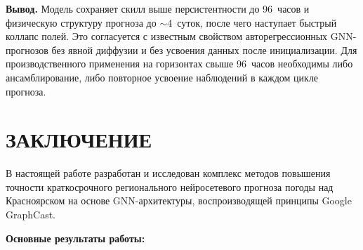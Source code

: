 \documentclass[14pt,a4paper]{extarticle}
\numberwithin{table}{section}
\numberwithin{figure}{section}
\numberwithin{equation}{section}
\begin{document}
\textbf{Вывод.} Модель сохраняет скилл выше персистентности до 96~часов
и физическую структуру прогноза до \(\sim\)4~суток, после чего наступает
быстрый коллапс полей. Это согласуется с известным свойством
авторегрессионных GNN-прогнозов без явной диффузии и без усвоения данных
после инициализации. Для производственного применения на горизонтах
свыше 96~часов необходимы либо ансамблирование, либо повторное усвоение
наблюдений в каждом цикле прогноза.


\newpage

\section{ЗАКЛЮЧЕНИЕ}\label{ux437ux430ux43aux43bux44eux447ux435ux43dux438ux435}

В настоящей работе разработан и исследован комплекс методов повышения
точности краткосрочного регионального нейросетевого прогноза погоды над
Красноярском на основе GNN-архитектуры, воспроизводящей принципы Google
GraphCast.

\textbf{Основные результаты работы:}
\end{document}
